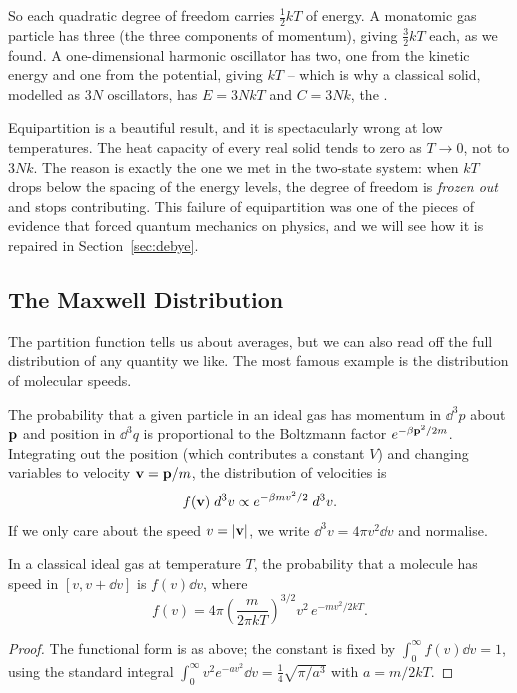 \documentclass[a4paper]{scrartcl}
\begin{document}
So each quadratic degree of freedom carries $\tfrac 12 kT$ of energy. A monatomic gas particle has three (the three components of momentum), giving $\tfrac 32 kT$ each, as we found. A one-dimensional harmonic oscillator has two, one from the kinetic energy and one from the potential, giving $kT$ -- which is why a classical solid, modelled as $3N$ oscillators, has $E = 3NkT$ and $C = 3Nk$, the .

Equipartition is a beautiful result, and it is spectacularly wrong at low temperatures. The heat capacity of every real solid tends to zero as $T \to 0$, not to $3Nk$. The reason is exactly the one we met in the two-state system: when $kT$ drops below the spacing of the energy levels, the degree of freedom is \emph{frozen out} and stops contributing. This failure of equipartition was one of the pieces of evidence that forced quantum mechanics on physics, and we will see how it is repaired in Section~\ref{sec:debye}.

\subsection{The Maxwell Distribution}

The partition function tells us about averages, but we can also read off the full distribution of any quantity we like. The most famous example is the distribution of molecular speeds.

The probability that a given particle in an ideal gas has momentum in $\dd^3 p$ about $\mathbf{p}$ and position in $\dd^3 q$ is proportional to the Boltzmann factor $e^{-\beta \mathbf{p}^2/2m}$. Integrating out the position (which contributes a constant $V$) and changing variables to velocity $\mathbf{v} = \mathbf{p}/m$, the distribution of velocities is
$$
f(\mathbf{v})\; d^3 v \propto e^{-\beta m v^2/2}\; d^3 v.
$$
If we only care about the speed $v = |\mathbf{v}|$, we write $\dd^3 v = 4\pi v^2 \dd v$ and normalise.

\begin{proposition}
	In a classical ideal gas at temperature $T$, the probability that a molecule has speed in $[v, v+\dd v]$ is $f(v)\dd v$, where
	$$
	f(v) = 4\pi\left(\frac{m}{2\pi kT}\right)^{3/2} v^2\, e^{-mv^2/2kT}.
	$$
\end{proposition}
\begin{proof}
	The functional form is as above; the constant is fixed by $\int_0^\infty f(v)\dd v = 1$, using the standard integral $\int_0^\infty v^2 e^{-av^2}\dd v = \tfrac 14\sqrt{\pi/a^3}$ with $a = m/2kT$.
\end{proof}
\end{document}
